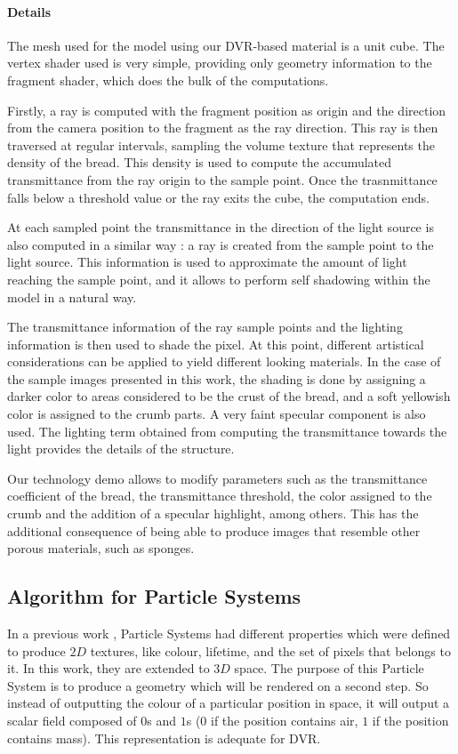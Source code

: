 \documentclass[oneside,a4paper,english,links]{amca}
\begin{document}
\paragraph{Details}

The mesh used for the model using our DVR-based material is a unit
cube. The vertex shader used is very simple, providing only geometry
information to the fragment shader, which does the bulk of the
computations. 

Firstly, a ray is computed with the fragment position as origin and
the direction from the camera position to the fragment as the ray
direction. This ray is then traversed at regular intervals, sampling
the volume texture that represents the density of the bread. This
density is used to compute the accumulated transmittance from the ray
origin to the sample point. Once the trasnmittance falls below a
threshold value or the ray exits the cube, the computation ends.

At each sampled point the transmittance in the direction of the light
source is also computed in a similar way : a ray is created from the
sample point to the light source. This information is used to
approximate the amount of light reaching the sample point, and it
allows to perform self shadowing within the model in a natural
way. 

The transmittance information of the ray sample points and the
lighting information is then used to shade the pixel. At this point,
different artistical considerations can be applied to yield different
looking materials. In the case of the sample images presented
in this work, the shading is done by assigning a darker color to areas
considered to be the crust of the bread, and a soft yellowish color is
assigned to the crumb parts. A very faint specular component is also
used. The lighting term obtained from computing the transmittance
towards the light provides the details of the structure.

Our technology demo allows to modify parameters such as the
transmittance coefficient of the bread, the transmittance
threshold, the color assigned to the crumb and the addition of a
specular highlight, among others. This has the additional consequence
of being able to produce images that resemble other porous materials,
such as sponges.

\subsection{Algorithm for Particle Systems}
In a previous work \citep{Baravalle2011}, Particle Systems had different properties which were defined to produce $2D$ textures, like colour, lifetime, and the set of pixels that belongs to it. In this work, they are extended to $3D$ space. The purpose of this Particle System is to produce a geometry which will be rendered on a second step. So instead of outputting the colour of a particular position in space, it will output a scalar field composed of $0$s and $1$s ($0$ if the position contains air, $1$ if the position contains mass). This representation is adequate for DVR. 
\end{document}
